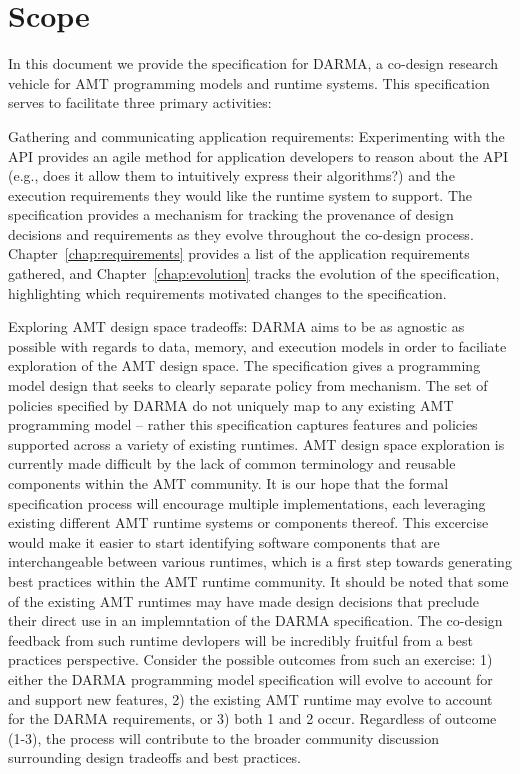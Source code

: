 \section{Scope}\label{sec:scope}
In this document we provide the specification for DARMA,
a co-design research vehicle for \gls{AMT} programming models and runtime
systems.  This specification serves to facilitate three primary activities: 
\begin{compactdesc}
\item[Gathering and communicating application requirements:]
Experimenting with the \gls{API} provides an agile method for application
developers to reason about the \gls{API} (e.g., does it allow them to intuitively
    express their algorithms?) and the execution requirements they would like
the runtime system to support.
The specification provides a mechanism for tracking the
provenance of design decisions and requirements as they evolve throughout the co-design
process. Chapter~\ref{chap:requirements} provides a list of the application
requirements gathered,  and
Chapter~\ref{chap:evolution} tracks the evolution of
the specification, highlighting which requirements
motivated changes to the specification.
\item[Exploring AMT design space tradeoffs:]
DARMA aims to be as agnostic as possible with regards to data, memory, and execution
models in order to faciliate exploration of the AMT design space. The
specification gives a programming model design that seeks to
clearly separate policy from mechanism.  The set of policies specified by DARMA do not uniquely map to any
existing AMT programming model -- rather this specification captures features and policies
supported across a variety of existing runtimes.
\gls{AMT} design space exploration is currently made difficult by the lack of
common terminology and reusable components within the \gls{AMT} community.  It
is our hope that the formal specification process will encourage multiple
implementations, each leveraging
existing different \gls{AMT} runtime systems or components thereof.  
This excercise would make it easier to start identifying 
software components that are interchangeable between various runtimes, which is a first
step towards generating best practices within the \gls{AMT} runtime community.
It should be noted that some of the existing \gls{AMT} runtimes 
may have made design decisions that preclude their direct use in an
implemntation of the DARMA specification. The co-design feedback from such runtime devlopers 
will be incredibly fruitful from a best practices perspective. Consider 
the possible outcomes from such an exercise: 1) either the DARMA 
programming model specification will evolve to account for and support new
features, 2) the existing \gls{AMT} runtime may evolve to account for the DARMA
requirements, or 3) both 1 and 2 occur.  Regardless of outcome (1-3), the process will contribute to the
broader community discussion surrounding design tradeoffs and best practices. 


\end{compactdesc}
